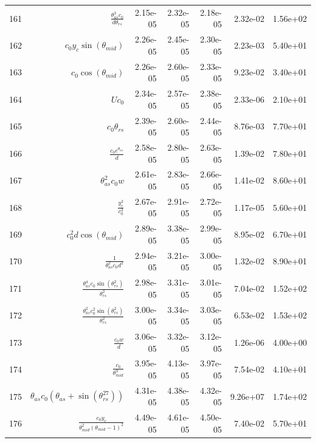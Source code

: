\begin{tabularx}{\textwidth}{lRRRRRl}
161  &  $ \displaystyle\frac{\theta_{as}^{3} c_{0}}{d \theta_{rs}} $  &  2.15e-05  &  2.32e-05  &  2.18e-05  &  2.32e-02  &  1.56e+02  \\ 
162  &  $ c_{0} y_c \sin{\left(\theta_{mid} \right)} $  &  2.26e-05  &  2.45e-05  &  2.30e-05  &  2.23e-03  &  5.40e+01  \\ 
163  &  $ c_{0} \cos{\left(\theta_{mid} \right)} $  &  2.26e-05  &  2.60e-05  &  2.33e-05  &  9.23e-02  &  3.40e+01  \\ 
164  &  $ U c_{0} $  &  2.34e-05  &  2.57e-05  &  2.38e-05  &  2.33e-06  &  2.10e+01  \\ 
165  &  $ c_{0} \theta_{rs} $  &  2.39e-05  &  2.60e-05  &  2.44e-05  &  8.76e-03  &  7.70e+01  \\ 
166  &  $ \displaystyle\frac{c_{0} e^{\theta_{as}}}{d} $  &  2.58e-05  &  2.80e-05  &  2.63e-05  &  1.39e-02  &  7.80e+01  \\ 
167  &  $ \theta_{as}^{2} c_{0} w $  &  2.61e-05  &  2.83e-05  &  2.66e-05  &  1.41e-02  &  8.60e+01  \\ 
168  &  $ \displaystyle\frac{y_c^{3}}{c_{0}^{3}} $  &  2.67e-05  &  2.91e-05  &  2.72e-05  &  1.17e-05  &  5.60e+01  \\ 
169  &  $ c_{0}^{2} d \cos{\left(\theta_{mid} \right)} $  &  2.89e-05  &  3.38e-05  &  2.99e-05  &  8.95e-02  &  6.70e+01  \\ 
170  &  $ \displaystyle\frac{1}{\theta_{as}^{2} c_{0} d^{2}} $  &  2.94e-05  &  3.21e-05  &  3.00e-05  &  1.32e-02  &  8.90e+01  \\ 
171  &  $ \displaystyle\frac{\theta_{as}^{4} c_{0} \sin{\left(\theta_{rs}^{2} \right)}}{\theta_{rs}^{2}} $  &  2.98e-05  &  3.31e-05  &  3.01e-05  &  7.04e-02  &  1.52e+02  \\ 
172  &  $ \displaystyle\frac{\theta_{as}^{2} c_{0}^{2} \sin{\left(\theta_{rs}^{2} \right)}}{\theta_{rs}^{2}} $  &  3.00e-05  &  3.34e-05  &  3.03e-05  &  6.53e-02  &  1.53e+02  \\ 
173  &  $ \displaystyle\frac{c_{0} w}{d} $  &  3.06e-05  &  3.32e-05  &  3.12e-05  &  1.26e-06  &  4.00e+00  \\ 
174  &  $ \displaystyle\frac{c_{0}}{\theta_{mid}^{9}} $  &  3.95e-05  &  4.13e-05  &  3.97e-05  &  7.54e-02  &  4.10e+01  \\ 
175  &  $ \theta_{as} c_{0} \left(\theta_{as} + \sin{\left(\theta_{rs}^{27} \right)}\right) $  &  4.31e-05  &  4.38e-05  &  4.32e-05  &  9.26e+07  &  1.74e+02  \\ 
176  &  $ \displaystyle\frac{c_{0} y_c}{\theta_{mid}^{2} \left(\theta_{mid} - 1\right)^{2}} $  &  4.49e-05  &  4.61e-05  &  4.50e-05  &  7.40e-02  &  5.70e+01  \\ 

\end{tabularx}
